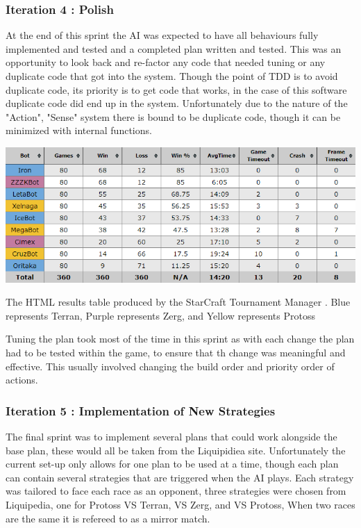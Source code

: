 \documentclass[journal]{IEEEtran}
\begin{document}
\subsubsection{Iteration 4 : Polish}
At the end of this sprint the AI was expected to have all behaviours fully implemented and tested and a completed plan written and tested. This was an opportunity to look back and re-factor any code that needed tuning or any duplicate code that got into the system. Though the point of TDD is to avoid duplicate code, its priority is to get code that works, in the case of this software duplicate code did end up in the system. Unfortunately due to the nature of the "Action", "Sense" system there is bound to be duplicate code, though it can be minimized with internal functions.
\begin{table}[]
	\centering
	\includegraphics[width=\textwidth]{STMResults}
	\caption{The HTML results table produced by the StarCraft Tournament Manager \cite{Tournament}. Blue represents Terran, Purple represents Zerg, and Yellow represents Protoss}
	\label{Table1}
\end{table}
Tuning the plan took most of the time in this sprint as with each change the plan had to be tested within the game, to ensure that th change was meaningful and effective. This usually involved changing the build order and priority order of actions.
\newline

\subsubsection{Iteration 5 : Implementation of New Strategies}
The final sprint was to implement several plans that could work alongside the base plan, these would all be taken from the Liquipidiea site. Unfortunately the current set-up only allows for one plan to be used at a time, though each plan can contain several strategies that are triggered when the AI plays. Each strategy was tailored to face each race as an opponent, three strategies were chosen from Liquipedia, one for Protoss VS Terran, VS Zerg, and VS Protoss, When two races are the same it is refereed to as a mirror match.
\end{document}
